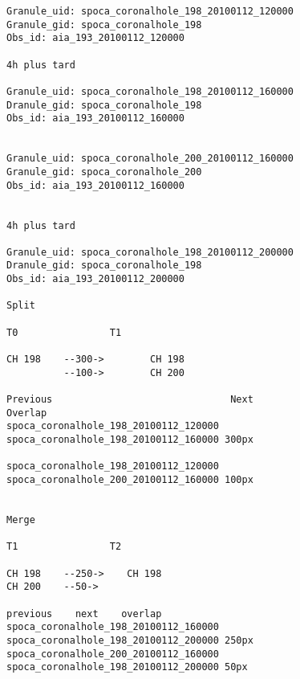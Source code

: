 \documentclass{article}
\begin{document}
\begin{verbatim}
Granule_uid: spoca_coronalhole_198_20100112_120000
Granule_gid: spoca_coronalhole_198
Obs_id: aia_193_20100112_120000

4h plus tard

Granule_uid: spoca_coronalhole_198_20100112_160000
Dranule_gid: spoca_coronalhole_198
Obs_id: aia_193_20100112_160000


Granule_uid: spoca_coronalhole_200_20100112_160000
Granule_gid: spoca_coronalhole_200
Obs_id: aia_193_20100112_160000


4h plus tard

Granule_uid: spoca_coronalhole_198_20100112_200000
Dranule_gid: spoca_coronalhole_198
Obs_id: aia_193_20100112_200000

Split

T0                T1

CH 198    --300->        CH 198
          --100->        CH 200

Previous                               Next                                  Overlap
spoca_coronalhole_198_20100112_120000  spoca_coronalhole_198_20100112_160000 300px

spoca_coronalhole_198_20100112_120000  spoca_coronalhole_200_20100112_160000 100px


Merge

T1                T2

CH 198    --250->    CH 198
CH 200    --50->

previous    next    overlap
spoca_coronalhole_198_20100112_160000
spoca_coronalhole_198_20100112_200000 250px
spoca_coronalhole_200_20100112_160000
spoca_coronalhole_198_20100112_200000 50px


\end{verbatim}


\end{document}
